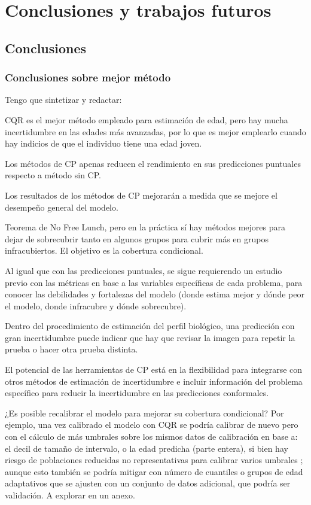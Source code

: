 \chapter{Conclusiones y trabajos futuros}

\section{Conclusiones}

\subsection{Conclusiones sobre mejor método }

Tengo que sintetizar y redactar:

CQR es el mejor método empleado para estimación de edad, pero hay mucha incertidumbre en las edades más avanzadas, por lo que es mejor emplearlo cuando hay indicios de que el individuo tiene una edad joven. 

Los métodos de CP apenas reducen el rendimiento en sus predicciones puntuales respecto a método sin CP.

Los resultados de los métodos de CP mejorarán a medida que se mejore el desempeño general del modelo.

Teorema de No Free Lunch, pero en la práctica sí hay métodos mejores para dejar de sobrecubrir tanto en algunos grupos para cubrir más en grupos infracubiertos. El objetivo es la cobertura condicional.

Al igual que con las predicciones puntuales, se sigue requierendo un estudio previo con las métricas en base a las variables específicas de cada problema, para conocer las debilidades y fortalezas del modelo (donde estima mejor y dónde peor el modelo, donde infracubre y dónde sobrecubre). 

Dentro del procedimiento de estimación del perfil biológico, una predicción con gran incertidumbre puede indicar que hay que revisar la imagen para repetir la prueba o hacer otra prueba distinta. 

El potencial de las herramientas de CP está en la flexibilidad para integrarse con otros métodos de estimación de incertidumbre e incluir información del problema específico para reducir la incertidumbre en las predicciones conformales.

¿Es posible recalibrar el modelo para mejorar su cobertura condicional? Por ejemplo, una vez calibrado el modelo con CQR se podría calibrar de nuevo pero con el cálculo de más umbrales sobre los mismos datos de calibración en base a: el decil de tamaño de intervalo, o la edad predicha (parte entera), si bien hay riesgo de poblaciones reducidas no representativas para calibrar varios umbrales ; aunque esto también se podría mitigar con número de cuantiles o grupos de edad adaptativos que se ajusten con un conjunto de datos adicional, que podría ser validación. A explorar en un anexo. 


